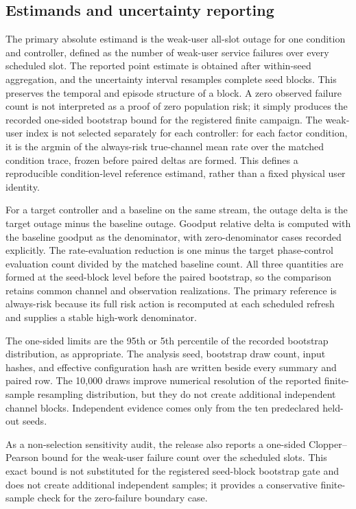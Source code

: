 \documentclass[10pt,twocolumn]{article}
\begin{document}
\subsection{Estimands and uncertainty
reporting}\label{estimands-and-uncertainty-reporting}

The primary absolute estimand is the weak-user all-slot outage for one
condition and controller, defined as the number of weak-user service
failures over every scheduled slot. The reported point estimate is
obtained after within-seed aggregation, and the uncertainty interval
resamples complete seed blocks. This preserves the temporal and episode
structure of a block. A zero observed failure count is not interpreted
as a proof of zero population risk; it simply produces the recorded
one-sided bootstrap bound for the registered finite campaign. The
weak-user index is not selected separately for each controller: for each
factor condition, it is the argmin of the always-risk true-channel mean
rate over the matched condition trace, frozen before paired deltas are
formed. This defines a reproducible condition-level reference estimand,
rather than a fixed physical user identity.

For a target controller and a baseline on the same stream, the outage
delta is the target outage minus the baseline outage. Goodput relative
delta is computed with the baseline goodput as the denominator, with
zero-denominator cases recorded explicitly. The rate-evaluation
reduction is one minus the target phase-control evaluation count divided
by the matched baseline count. All three quantities are formed at the
seed-block level before the paired bootstrap, so the comparison retains
common channel and observation realizations. The primary reference is
always-risk because its full risk action is recomputed at each scheduled
refresh and supplies a stable high-work denominator.

The one-sided limits are the 95th or 5th percentile of the recorded
bootstrap distribution, as appropriate. The analysis seed, bootstrap
draw count, input hashes, and effective configuration hash are written
beside every summary and paired row. The 10,000 draws improve numerical
resolution of the reported finite-sample resampling distribution, but
they do not create additional independent channel blocks. Independent
evidence comes only from the ten predeclared held-out seeds.

As a non-selection sensitivity audit, the release also reports a
one-sided Clopper--Pearson bound for the weak-user failure count over
the scheduled slots. This exact bound is not substituted for the
registered seed-block bootstrap gate and does not create additional
independent samples; it provides a conservative finite-sample check for
the zero-failure boundary case.
\end{document}
